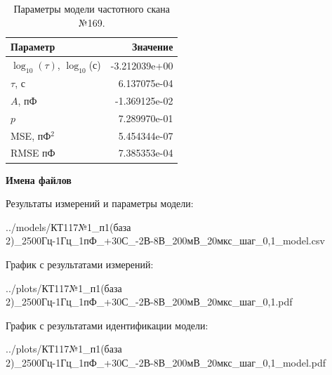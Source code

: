 \begin{table}[!ht]
    \centering
    \caption{Параметры модели частотного скана №169.}
    \begin{tabular}{|l|r|}
        \hline
        Параметр                                       & Значение                  \\ \hline
        $\log_{10}(\tau)$, $\log_{10}$(с)              & -3.212039e+00             \\ \hline
        $\tau$, с                                      & 6.137075e-04              \\ \hline
        $A$, пФ                                        & -1.369125e-02             \\ \hline
        $p$                                            & 7.289970e-01              \\ \hline
        MSE, пФ$^2$                                    & 5.454344e-07              \\ \hline
        RMSE пФ                                        & 7.385353e-04              \\ \hline
    \end{tabular}
    \label{table:frequency_scan_model_169}
\end{table}

\textbf{Имена файлов}

Результаты измерений и параметры модели:

\scriptsize../models/КТ117№1\_п1(база 2)\_2500Гц-1Гц\_1пФ\_+30С\_-2В-8В\_200мВ\_20мкс\_шаг\_0,1\_model.csv
\normalsize

График с результатами измерений:

\scriptsize../plots/КТ117№1\_п1(база 2)\_2500Гц-1Гц\_1пФ\_+30С\_-2В-8В\_200мВ\_20мкс\_шаг\_0,1.pdf
\normalsize

График с результатами идентификации модели:

\scriptsize../plots/КТ117№1\_п1(база 2)\_2500Гц-1Гц\_1пФ\_+30С\_-2В-8В\_200мВ\_20мкс\_шаг\_0,1\_model.pdf
\normalsize

